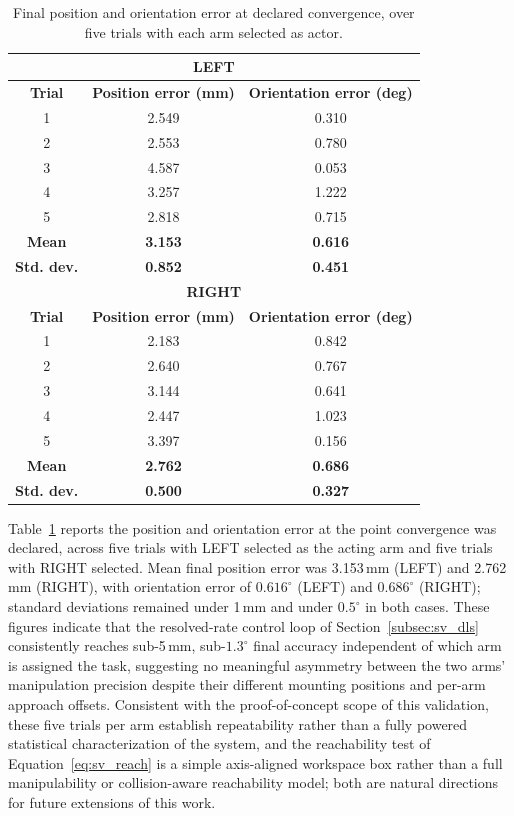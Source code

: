 \begin{table}[htbp]
\centering
\caption{Final position and orientation error at declared convergence, over five trials with each
arm selected as actor.}
\label{tab:sv_errormetrics}
\begin{tabular}{ccc}
\toprule
\multicolumn{3}{c}{\textbf{LEFT}} \\
\midrule
\textbf{Trial} & \textbf{Position error (mm)} & \textbf{Orientation error (deg)} \\
\midrule
1 & 2.549 & 0.310 \\
2 & 2.553 & 0.780 \\
3 & 4.587 & 0.053 \\
4 & 3.257 & 1.222 \\
5 & 2.818 & 0.715 \\
\textbf{Mean} & \textbf{3.153} & \textbf{0.616} \\
\textbf{Std. dev.} & \textbf{0.852} & \textbf{0.451} \\
\midrule
\multicolumn{3}{c}{\textbf{RIGHT}} \\
\midrule
\textbf{Trial} & \textbf{Position error (mm)} & \textbf{Orientation error (deg)} \\
\midrule
1 & 2.183 & 0.842 \\
2 & 2.640 & 0.767 \\
3 & 3.144 & 0.641 \\
4 & 2.447 & 1.023 \\
5 & 3.397 & 0.156 \\
\textbf{Mean} & \textbf{2.762} & \textbf{0.686} \\
\textbf{Std. dev.} & \textbf{0.500} & \textbf{0.327} \\
\bottomrule
\end{tabular}
\end{table}

Table~\ref{tab:sv_errormetrics} reports the position and orientation error at the point convergence
was declared, across five trials with LEFT selected as the acting arm and five trials with RIGHT
selected. Mean final position error was 3.153\,mm (LEFT) and 2.762\,mm (RIGHT), with orientation
error of $0.616^\circ$ (LEFT) and $0.686^\circ$ (RIGHT); standard deviations remained under 1\,mm
and under $0.5^\circ$ in both cases. These figures indicate that the resolved-rate control loop of
Section~\ref{subsec:sv_dls} consistently reaches sub-5\,mm, sub-$1.3^\circ$ final accuracy
independent of which arm is assigned the task, suggesting no meaningful asymmetry between the two
arms' manipulation precision despite their different mounting positions and per-arm approach
offsets. Consistent with the proof-of-concept scope of this validation, these five trials per arm
establish repeatability rather than a fully powered statistical characterization of the system, and
the reachability test of Equation~\eqref{eq:sv_reach} is a simple axis-aligned workspace box rather
than a full manipulability or collision-aware reachability model; both are natural directions for
future extensions of this work.

